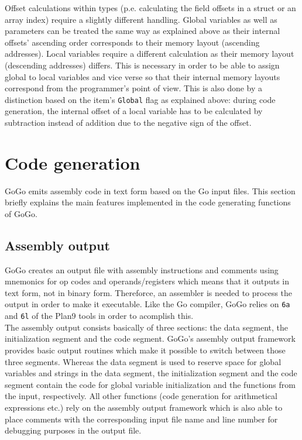 \documentclass[a4paper]{scrreprt}
\begin{document}
      Offset calculations within types (p.e. calculating the field offsets in a struct or an array index) require a slightly different handling. Global variables as well as parameters can be treated the same way as explained above as their internal offsets' ascending order corresponds to their memory layout (ascending addresses). Local variables require a different calculation as their memory layout (descending addresses) differs. This is necessary in order to be able to assign global to local variables and vice verse so that their internal memory layouts correspond from the programmer's point of view. This is also done by a distinction based on the item's \texttt{Global} flag as explained above: during code generation, the internal offset of a local variable has to be calculated by subtraction instead of addition due to the negative sign of the offset.

  \chapter{Code generation}
    GoGo emits assembly code in text form based on the Go input files. This section briefly explains the main features implemented in the code generating functions of GoGo.

    \section{Assembly output}
      GoGo creates an output file with assembly instructions and comments using mnemonics for op codes and operands/registers which means that it outputs in text form, not in binary form. Thereforce, an assembler is needed to process the output in order to make it executable. Like the Go compiler, GoGo relies on \texttt{6a} and \texttt{6l} of the Plan9 tools in order to acomplish this\cite{pik00}.\\
      The assembly output consists basically of three sections: the data segment, the initialization segment and the code segment. GoGo's assembly output framework provides basic output routines which make it possible to switch between those three segments. Whereas the data segment is used to reserve space for global variables and strings in the data segment, the initialization segment and the code segment contain the code for global variable initialization and the functions from the input, respectively. All other functions (code generation for arithmetical expressions etc.) rely on the assembly output framework which is also able to place comments with the corresponding input file name and line number for debugging purposes in the output file.
\end{document}
